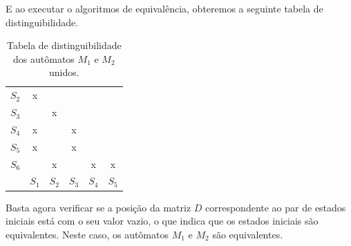 \documentclass[
	12pt,				%
	openany,
	oneside,
	a4paper,			%
	english,			%
	brazil				%
	]{abntex2}
\begin{document}
  E ao executar o algoritmos de equivalência, obteremos a seguinte tabela de distinguibilidade.

  \begin{table}[H]
    \centering
    \begin{tabular}{c c c c c c}
      \cline{2-2}
      $S_2$ & \multicolumn{1}{|c|}{x}  \\
      \cline{2-3}
      $S_3$ & \multicolumn{1}{|c|}{ } & \multicolumn{1}{c|}{x}  \\
      \cline{2-4}
      $S_4$ & \multicolumn{1}{|c|}{x} & \multicolumn{1}{c|}{ } & \multicolumn{1}{c|}{x} \\
      \cline{2-5}
      $S_5$ & \multicolumn{1}{|c|}{x} & \multicolumn{1}{c|}{ } & \multicolumn{1}{c|}{x}  & \multicolumn{1}{c|}{ } \\
      \cline{2-6}
      $S_6$ & \multicolumn{1}{|c|}{ } & \multicolumn{1}{c|}{x} & \multicolumn{1}{c|}{ } & \multicolumn{1}{c|}{x} & \multicolumn{1}{c|}{x} \\
      \cline{2-6}
          & $S_1$                   & $S_2$                  & $S_3$                  & $S_4$                  & $S_5$                  \\
    \end{tabular}
    \caption{Tabela de distinguibilidade dos autômatos $M_1$ e $M_2$ unidos.}
    \vspace{-0.5cm}
  \end{table}


  Basta agora verificar se a posição da matriz $D$ correspondente ao par de estados iniciais está com o seu valor vazio, o que indica que os estados iniciais são equivalentes. Neste caso, os autômatos $M_1$ e $M_2$ são equivalentes.
\end{document}
